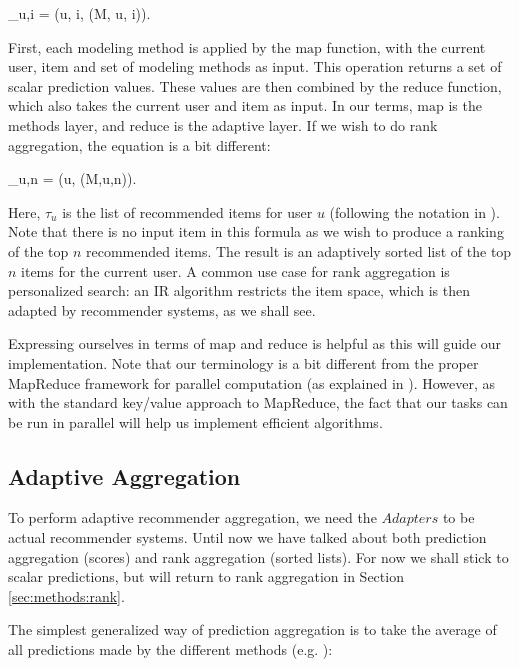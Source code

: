 \begin{eqsp}
  _{u,i} = (u, i, (M, u, i)).
\end{eqsp}
%
First, each modeling method is applied by the $\mathrm{map}$ function, with the current user, item and set of modeling methods as input.
This operation returns a set of scalar prediction values. 
These values are then combined by the $\mathrm{reduce}$ function, which also takes the current user and item as input.
In our terms, $\mathrm{map}$ is the methods layer, and $\mathrm{reduce}$ is the adaptive layer.
If we wish to do rank aggregation, the equation is a bit different:

\begin{eqsp}
  \tau_{u,n} = (u, (M,u,n)).
\end{eqsp}
%
Here, $\tau_{u}$ is the list of recommended items for user $u$ (following the notation in \citet[p3]{Dwork2001}).
Note that there is no input item in this formula as we wish to produce a ranking of the top $n$ recommended items.
The result is an adaptively sorted list of the top $n$ items for the current user.
A common use case for rank aggregation is personalized search:
an IR algorithm restricts the item space, which is then adapted by recommender systems,
as we shall see.

Expressing ourselves in terms of $\mathrm{map}$ and $\mathrm{reduce}$ is helpful 
as this will guide our implementation.
Note that our terminology is a bit different from the proper MapReduce framework
for parallel computation (as explained in \citet[p75]{Manning2008}).
However, as with the standard key/value approach to MapReduce,
the fact that our tasks can be run in parallel will help
us implement efficient algorithms.


\subsection{Adaptive Aggregation}

To perform adaptive recommender aggregation, we need the $Adapters$ to be actual recommender systems.
Until now we have talked about both prediction aggregation (scores) and rank aggregation (sorted lists).
For now we shall stick to scalar predictions, but will return to rank aggregation in Section \ref{sec:methods:rank}.

The simplest generalized way of prediction aggregation is to take the average of all predictions made
by the different methods (e.g. \citet[p3]{Aslam2001}):

